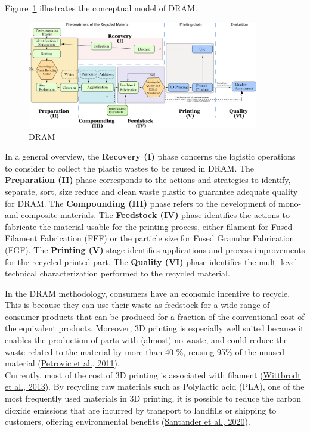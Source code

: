 \documentclass[
  11pt,
]{article}
\begin{document}
Figure~\ref{fig-dram} illustrates the conceptual model of DRAM.

\begin{figure}[H]

{\centering \includegraphics[width=0.9\textwidth,height=\textheight]{figures/DRAM-10.png}

}

\caption{\label{fig-dram}DRAM}

\end{figure}

In a general overview, the \textbf{Recovery (I)} phase concerns the
logistic operations to consider to collect the plastic wastes to be
reused in DRAM. The \textbf{Preparation (II)} phase corresponds to the
actions and strategies to identify, separate, sort, size reduce and
clean waste plastic to guarantee adequate quality for DRAM. The
\textbf{Compounding (III)} phase refers to the development of mono- and
composite-materials. The \textbf{Feedstock (IV)} phase identifies the
actions to fabricate the material usable for the printing process,
either filament for Fused Filament Fabrication (FFF) or the particle
size for Fused Granular Fabrication (FGF). The \textbf{Printing (V)}
stage identifies applications and process improvements for the recycled
printed part. The \textbf{Quality (VI)} phase identifies the multi-level
technical characterization performed to the recycled material.

In the DRAM methodology, consumers have an economic incentive to
recycle. This is because they can use their waste as feedstock for a
wide range of consumer products that can be produced for a fraction of
the conventional cost of the equivalent products. Moreover, 3D printing
is especially well suited because it enables the production of parts
with (almost) no waste, and could reduce the waste related to the
material by more than 40 \%, reusing 95\% of the unused material
(\protect\hyperlink{ref-Petrovic2011}{Petrovic et al., 2011}).\\
Currently, most of the cost of 3D printing is associated with filament
(\protect\hyperlink{ref-Wittbrodt2013}{Wittbrodt et al., 2013}). By
recycling raw materials such as Polylactic acid (PLA), one of the most
frequently used materials in 3D printing, it is possible to reduce the
carbon dioxide emissions that are incurred by transport to landfills or
shipping to customers, offering environmental benefits
(\protect\hyperlink{ref-Santander2020}{Santander et al., 2020}).
\end{document}
